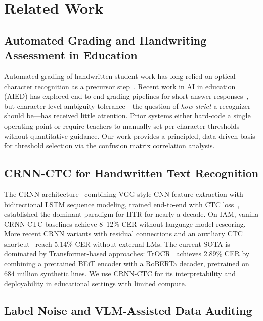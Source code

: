 \documentclass[conference]{IEEEtran}
\begin{document}
\section{Related Work}

\subsection{Automated Grading and Handwriting Assessment in Education}

Automated grading of handwritten student work has long relied on optical character recognition as a precursor step~\cite{gao2023}. Recent work in AI in education (AIED) has explored end-to-end grading pipelines for short-answer responses~\cite{burrows2015}, but character-level ambiguity tolerance---the question of \emph{how strict} a recognizer should be---has received little attention. Prior systems either hard-code a single operating point or require teachers to manually set per-character thresholds without quantitative guidance. Our work provides a principled, data-driven basis for threshold selection via the confusion matrix correlation analysis.

\subsection{CRNN-CTC for Handwritten Text Recognition}

The CRNN architecture~\cite{shi2016} combining VGG-style CNN feature extraction with bidirectional LSTM sequence modeling, trained end-to-end with CTC loss~\cite{graves2006}, established the dominant paradigm for HTR for nearly a decade. On IAM, vanilla CRNN-CTC baselines achieve 8--12\% CER without language model rescoring. More recent CRNN variants with residual connections and an auxiliary CTC shortcut~\cite{retsinas2022} reach 5.14\% CER without external LMs. The current SOTA is dominated by Transformer-based approaches: TrOCR~\cite{li2021} achieves 2.89\% CER by combining a pretrained BEiT encoder with a RoBERTa decoder, pretrained on 684 million synthetic lines. We use CRNN-CTC for its interpretability and deployability in educational settings with limited compute.

\subsection{Label Noise and VLM-Assisted Data Auditing}
\end{document}
